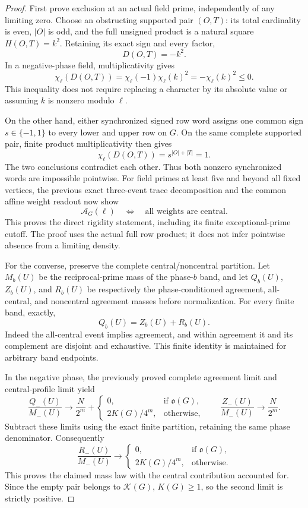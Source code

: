 \documentclass[11pt]{article}
\begin{document}
\begin{proof}
First prove exclusion at an actual field prime, independently of any
limiting zero. Choose an obstructing supported pair \((O,T)\):
its total cardinality is even, \(|O|\) is odd, and the full unsigned
product is a natural square \(H(O,T)=k^2\).
Retaining its exact sign and every factor,
\[
                              D(O,T)=-k^2.
\]
In a negative-phase field, multiplicativity gives
\[
             \chi_\ell(D(O,T))
                  =\chi_\ell(-1)\chi_\ell(k)^2
                  =-\chi_\ell(k)^2\leq0.
\]
This inequality does not require replacing a character by its
absolute value or assuming \(k\) is nonzero modulo \(\ell\).

On the other hand, either synchronized signed row word assigns one
common sign \(s\in\{-1,1\}\) to every lower and upper row on \(G\).
On the same complete supported pair, finite product multiplicativity
then gives
\[
                \chi_\ell(D(O,T))=s^{|O|+|T|}=1.
\]
The two conclusions contradict each other.
Thus both nonzero synchronized words are impossible pointwise.
For field primes at least five and beyond all fixed vertices, the
previous exact three-event trace decomposition and the common affine
weight readout now show
\[
        \mathcal A_G(\ell)
                  \quad\Longleftrightarrow\quad
                         \text{all weights are central}.
\]
This proves the direct rigidity statement, including its finite
exceptional-prime cutoff. The proof uses the actual full row product;
it does not infer pointwise absence from a limiting density.

For the converse, preserve the complete central/noncentral partition.
Let \(M_b(U)\) be the reciprocal-prime mass of the phase-\(b\) band,
and let \(Q_b(U)\), \(Z_b(U)\), and \(R_b(U)\) be respectively the
phase-conditioned agreement, all-central, and noncentral agreement
masses before normalization. For every finite band, exactly,
\[
                              Q_b(U)=Z_b(U)+R_b(U).
\]
Indeed the all-central event implies agreement, and within agreement
it and its complement are disjoint and exhaustive.
This finite identity is maintained for arbitrary band endpoints.

In the negative phase, the previously proved complete agreement limit
and central-profile limit yield
\[
 \frac{Q_-(U)}{M_-(U)}
      \longrightarrow\frac{N}{2^m}+
       \begin{cases}
        0,&\text{if }\mathfrak o(G),\\
        2K(G)/4^m,&\text{otherwise},
       \end{cases}
 \qquad
 \frac{Z_-(U)}{M_-(U)}\longrightarrow\frac{N}{2^m}.
\]
Subtract these limits using the exact finite partition, retaining the
same phase denominator. Consequently
\[
 \frac{R_-(U)}{M_-(U)}
       \longrightarrow
       \begin{cases}
        0,&\text{if }\mathfrak o(G),\\
        2K(G)/4^m,&\text{otherwise}.
       \end{cases}
\]
This proves the claimed mass law with the central contribution
accounted for. Since the empty pair belongs to \(\mathcal K(G)\),
\(K(G)\geq1\), so the second limit is strictly positive.


\end{proof}
\end{document}
